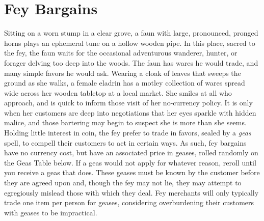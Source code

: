 \documentclass[10pt,a4paper,twoside,twocolumn,openany,nodeprecatedcode,bg=print]{dndbook}
\begin{document}
\section{Fey Bargains}
Sitting on a worn stump in a clear grove, a faun with large, pronounced, pronged horns plays an ephemeral tune on a hollow wooden pipe. In this place, sacred to the fey, the faun waits for the occasional adventurous wanderer, hunter, or forager delving too deep into the woods. The faun has wares he would trade, and many simple favors he would ask.
Wearing a cloak of leaves that sweeps the ground as she walks, a female eladrin has a motley collection of wares spread wide across her wooden tabletop at a local market. She smiles at all who approach, and is quick to inform those visit of her no-currency policy. It is only when her customers are deep into negotiations that her eyes sparkle with hidden malice, and those bartering may begin to suspect she is more than she seems.
Holding little interest in coin, the fey prefer to trade in favors, sealed by a \textit{geas} spell, to compell their customers to act in certain ways. As such, fey bargains have no currency cost, but have an associated price in geases, rolled randomly on the Geas Table below. If a geas would not apply for whatever reason, reroll until you receive a geas that does. These geases must be known by the customer before they are agreed upon and, though the fey may not lie, they may attempt to egregiously mislead those with which they deal. Fey merchants will only typically trade one item per person for geases, considering overburdening their customers with geases to be impractical.
\end{document}
